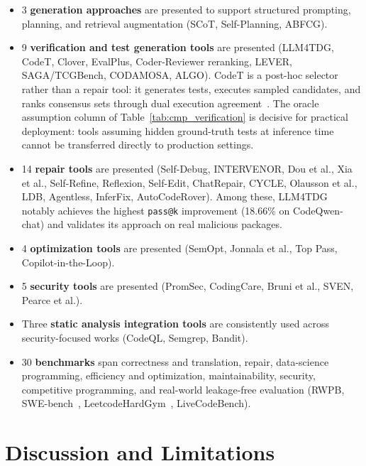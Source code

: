 \documentclass[10pt,a4paper]{article}
\begin{document}
\begin{itemize}[leftmargin=*]
\item 3 \textbf{generation approaches} are presented to support structured prompting, planning, and retrieval augmentation (SCoT, Self-Planning, ABFCG).
\item 9 \textbf{verification and test generation tools} are presented (LLM4TDG, CodeT, Clover, EvalPlus, Coder-Reviewer reranking, LEVER, SAGA/TCGBench, CODAMOSA, ALGO). CodeT is a post-hoc selector rather than a repair tool: it generates tests, executes sampled candidates, and ranks consensus sets through dual execution agreement~\cite{chenbei2023}. The oracle assumption column of Table~\ref{tab:cmp_verification} is decisive for practical deployment: tools assuming hidden ground-truth tests at inference time cannot be transferred directly to production settings.
\item 14 \textbf{repair tools} are presented (Self-Debug, INTERVENOR, Dou et al., Xia et al., Self-Refine, Reflexion, Self-Edit, ChatRepair, CYCLE, Olausson et al., LDB, Agentless, InferFix, AutoCodeRover). Among these, LLM4TDG notably achieves the highest \texttt{pass@k} improvement (18.66\% on CodeQwen-chat) and validates its approach on real malicious packages.
\item 4 \textbf{optimization tools} are presented (SemOpt, Jonnala et al., Top Pass, Copilot-in-the-Loop).
\item 5 \textbf{security tools} are presented (PromSec, CodingCare, Bruni et al., SVEN, Pearce et al.).
\item Three \textbf{static analysis integration tools} are consistently used across security-focused works (CodeQL, Semgrep, Bandit).
\item 30 \textbf{benchmarks} span correctness and translation, repair, data-science programming, efficiency and optimization, maintainability, security, competitive programming, and real-world leakage-free evaluation (RWPB, SWE-bench~\cite{jimenez2024swebench}, LeetcodeHardGym~\cite{shinn2023}, LiveCodeBench).
\end{itemize}

\section{Discussion and Limitations}
\label{sec:discussion}
\end{document}
